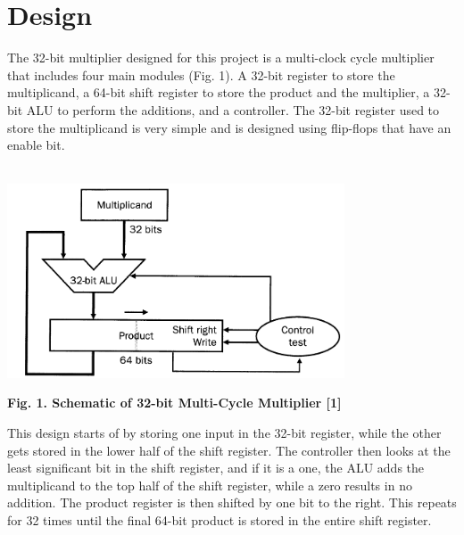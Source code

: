 \documentclass{report}
\begin{document}
\section*{Design}
The 32-bit multiplier designed for this project is a multi-clock cycle multiplier that includes four main modules (Fig. 1). A 32-bit register to store the multiplicand, a 64-bit shift register to store the product and the multiplier, a 32-bit ALU to perform the additions, and a controller. The 32-bit register used to store the multiplicand is very simple and is designed using flip-flops that have an enable bit.
\\\\
\begin{center} \includegraphics[width=10cm]{MultiClock_schem.png}\end{center}
\begin{center}\bf Fig. 1. Schematic of 32-bit Multi-Cycle Multiplier [1] \end{center}
\noindent
 This design starts of by storing one input in the 32-bit register, while the other gets stored in the lower half of the shift register. The controller then looks at the least significant bit in the shift register, and if it is a one, the ALU adds the multiplicand to the top half of the shift register, while a zero results in no addition. The product register is then shifted by one bit to the right. This repeats for 32 times until the final 64-bit product is stored in the entire shift register.
 \\
\end{document}

